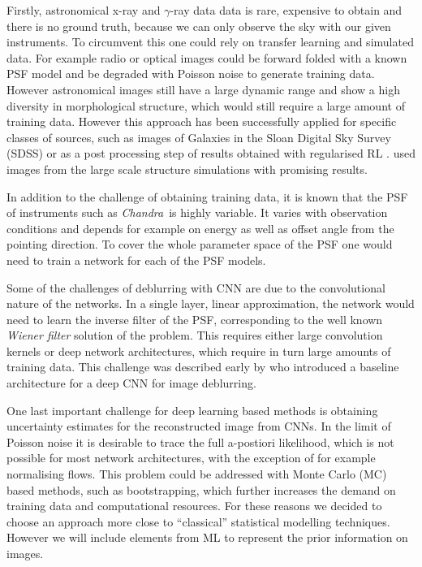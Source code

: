 \documentclass[twocolumn]{aastex631}
\newcommand{\chandra}{\textit{Chandra}~}
\newcommand{\gammaray}{$\gamma$-ray\xspace}
\begin{document}
    Firstly, astronomical x-ray and \gammaray data data is rare, expensive to obtain and there is no ground truth, because we can only observe the sky with our given instruments. To circumvent this one could rely on transfer learning and simulated data. For example radio or optical images could be forward folded with a known PSF model and be degraded with Poisson noise to generate training data. However astronomical images still have a large dynamic range and show a high diversity in morphological structure, which would still require a large amount of training data. However this approach has been successfully applied for specific classes of sources, such as images of Galaxies in the Sloan Digital Sky Survey (SDSS) \citep{Schawinski2017} or as a post processing step of results obtained with regularised RL \citep{Akhaury2022}. \cite{Sweere2022} used images from
    the large scale structure simulations with promising results.

    In addition to the challenge of obtaining training data, it is known that the PSF of instruments such as \chandra is highly variable. It varies with observation conditions and depends for example on energy as well as offset angle from the pointing direction. To cover the whole parameter space of the PSF one would need to train a network for each of the PSF models.

    Some of the challenges of deblurring with CNN are due to the convolutional nature of the networks. In a single layer, linear approximation, the network would need to learn the inverse filter of the PSF, corresponding to the well known \textit{Wiener filter} solution of the problem. This requires either large convolution kernels or deep network architectures, which require in turn large amounts of training data. This challenge was described early by \cite{Li2014} who introduced a baseline architecture for a deep CNN for image deblurring.
    
    One last important challenge for deep learning based methods is obtaining uncertainty estimates for the reconstructed image from CNNs. In the limit of Poisson noise it is desirable to trace the full a-postiori likelihood, which is not possible for most network architectures, with the exception of for example normalising flows. This problem could be addressed with Monte Carlo (MC) based methods, such as bootstrapping, which further increases the demand on training data and computational resources. For these reasons we decided to choose an approach more close to \enquote{classical} statistical modelling techniques. However we will include elements from ML to represent the prior information on images.
\end{document}
